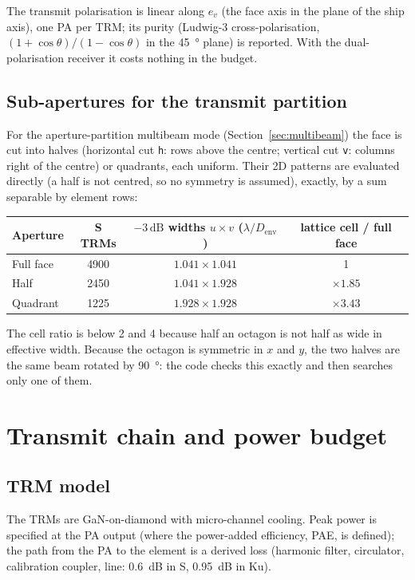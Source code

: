 \documentclass[11pt,a4paper]{article}
\newcommand{\code}[1]{\texttt{\small #1}}
\newcommand{\dB}{\,\mathrm{dB}}
\newcommand{\Denv}{D_{\mathrm{env}}}
\begin{document}
The transmit polarisation is linear along $e_v$ (the face axis in the plane of the ship axis), one PA per TRM; its
purity (Ludwig-3 cross-polarisation, $(1+\cos\theta)/(1-\cos\theta)$ in the \SI{45}{\degree} plane) is reported. With
the dual-polarisation receiver it costs nothing in the budget.

\subsection{Sub-apertures for the transmit partition}\label{sec:subap}
For the aperture-partition multibeam mode (Section~\ref{sec:multibeam}) the face is cut into halves (horizontal cut
\code{h}: rows above the centre; vertical cut \code{v}: columns right of the centre) or quadrants, each uniform. Their
2D patterns are evaluated directly (a half is not centred, so no symmetry is assumed), exactly, by a sum separable by
element rows:
\begin{center}
\begin{tabular}{@{}lccc@{}}
\toprule
Aperture & S TRMs & $-3\dB$ widths $u\times v$ ($\lambda/\Denv$) & lattice cell / full face\\
\midrule
Full face & \num{4900} & $1.041\times1.041$ & 1\\
Half & \num{2450} & $1.041\times1.928$ & $\times1.85$\\
Quadrant & \num{1225} & $1.928\times1.928$ & $\times3.43$\\
\bottomrule
\end{tabular}
\end{center}
The cell ratio is below 2 and 4 because half an octagon is not half as wide in effective width. Because the octagon is
symmetric in $x$ and $y$, the two halves are the same beam rotated by \SI{90}{\degree}: the code checks this exactly
and then searches only one of them.

\section{Transmit chain and power budget}

\subsection{TRM model}
The TRMs are GaN-on-diamond with micro-channel cooling. Peak power is specified at the PA output (where the
power-added efficiency, PAE, is defined); the path from the PA to the element is a derived loss (harmonic filter,
circulator, calibration coupler, line: \SI{0.6}{dB} in S, \SI{0.95}{dB} in Ku).
\end{document}
